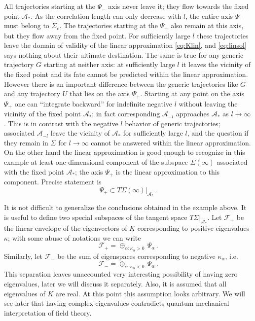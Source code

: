 All trajectories starting at the $\Psi_-$ axis never leave it; they flow towards
the fixed point $\mathcal A_*$. As the correlation length can only decrease with
$l$, the entire axis $\Psi_-$ must belong to $\Sigma_c$. The trajectories
starting at the $\Psi_+$ also remain at this axis, but they flow away from the
fixed point. For sufficiently large $l$ these trajectories leave the domain of
validity of the linear approximation \eqref{eq:Klin}, and \eqref{eq:linsol} says
nothing about their ultimate destination. The same is true for any generic
trajectory $G$ starting at neither axis: at sufficiently large $l$ it leaves the
vicinity of the fixed point and its fate cannot be predicted within the linear
approximation. However there is an important difference between the generic
trajectories like $G$ and any trajectory $U$ that lies on the axis $\Psi_+$.
Starting at any point on the axis $\Psi_+$ one can ``integrate backward'' for
indefinite negative $l$ without leaving the vicinity of the fixed point
$\mathcal A_*$; in fact corresponding $\mathcal A_{-l}$ approaches $\mathcal A_*$
as $l\to\infty$. This is in contrast with the negative $l$ behavior of generic
trajectories; associated $\mathcal A_{-l}$ leave the vicinity of $\mathcal A_*$
for sufficiently large $l$, and the question if they remain in $\Sigma$ for
$l\to\infty$ cannot be answered within the linear approximation. On the other
hand the linear approximation is good enough to recognize in this example at
least one-dimensional component of the subspace $\Sigma(\infty)$ associated with
the fixed point $\mathcal A_*$; the axis $\Psi_+$ is the linear approximation to
this component. Precise statement is
\[
\Psi_+\subset T\Sigma(\infty)|_{\mathcal A_*}\,.
\]

It is not difficult to generalize the conclusions obtained in the example above.
It is useful to define two special subspaces of the tangent space
$T\Sigma|_{\mathcal A_*}$. Let $\mathcal F_+$ be the linear envelope of the
eigenvectors of $K$ corresponding to positive eigenvalues $\kappa$; with some
abuse of notations we can write
\[
\mathcal F_+=\oplus_{\alpha:\kappa_\alpha>0}\,\Psi_\alpha\,.
\]
Similarly, let $\mathcal F_-$ be the sum of eigenspaces corresponding to negative
$\kappa_\alpha$, i.e.
\[
\mathcal F_-=\oplus_{\alpha:\kappa_\alpha<0}\,\Psi_\alpha\,.
\]
This separation leaves unaccounted very interesting possibility of having zero
eigenvalues, later we will discuss it separately. Also, it is assumed that all
eigenvalues of $K$ are real. At this point this assumption looks arbitrary. We
will see later that having complex eigenvalues contradicts quantum mechanical
interpretation of field theory.

